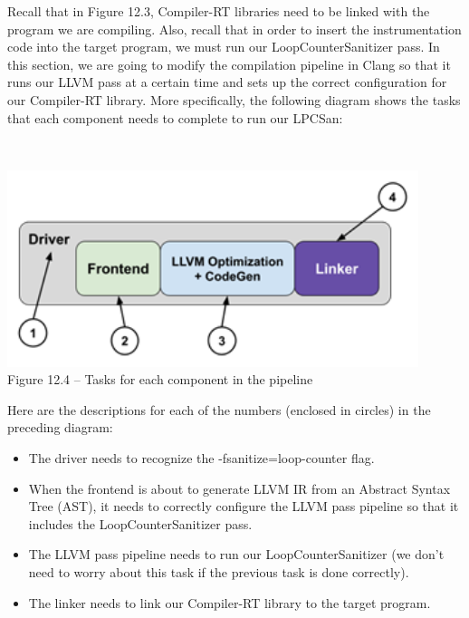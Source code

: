 Recall that in Figure 12.3, Compiler-RT libraries need to be linked with the program we are compiling. Also, recall that in order to insert the instrumentation code into the target program, we must run our LoopCounterSanitizer pass. In this section, we are going to modify the compilation pipeline in Clang so that it runs our LLVM pass at a certain time and sets up the correct configuration for our Compiler-RT library. More specifically, the following diagram shows the tasks that each component needs to complete to run our LPCSan:

\hspace*{\fill} \\ %
\begin{center}
\includegraphics[width=0.9\textwidth]{content/3/chapter12/images/4.png}\\
Figure 12.4 – Tasks for each component in the pipeline
\end{center}

Here are the descriptions for each of the numbers (enclosed in circles) in the preceding diagram:

\begin{itemize}
\item The driver needs to recognize the -fsanitize=loop-counter flag.
\item When the frontend is about to generate LLVM IR from an Abstract Syntax Tree (AST), it needs to correctly configure the LLVM pass pipeline so that it includes the LoopCounterSanitizer pass.
\item The LLVM pass pipeline needs to run our LoopCounterSanitizer (we don't need to worry about this task if the previous task is done correctly).
\item The linker needs to link our Compiler-RT library to the target program.
\end{itemize}

